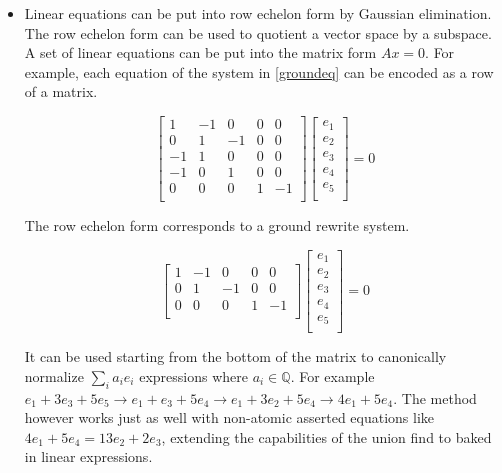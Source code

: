 \documentclass[sigconf]{acmart}
\begin{document}
\begin{itemize}

\item  Linear equations can be put into row echelon form by Gaussian elimination. The row echelon form can be used to quotient a vector space by a subspace. A set of linear equations can be put into the matrix form $Ax=0$. For example, each equation of the system in \ref{groundeq} can be encoded as a row of a matrix. 

\[
\begin{bmatrix}
1 & - 1 & 0 & 0 & 0 \\
0 & 1 & -1 & 0 & 0 \\
-1 & 1 & 0 & 0 & 0 \\
-1 & 0 & 1 & 0 & 0 \\
0 & 0 & 0 & 1 & -1 \\
\end{bmatrix}
\begin{bmatrix}
   e_1 \\
   e_2 \\
   e_3 \\
   e_4 \\
   e_5 \\
\end{bmatrix}
 = 0
\]

The row echelon form corresponds to a ground rewrite system. 

\[
\begin{bmatrix}
1 & - 1 & 0 & 0 & 0 \\
0 & 1 & -1 & 0 & 0 \\
0 & 0 & 0 & 1 & -1 \\
\end{bmatrix}
\begin{bmatrix}
   e_1 \\
   e_2 \\
   e_3 \\
   e_4 \\
   e_5 \\
\end{bmatrix}
 = 0
\]


It can be used starting from the bottom of the matrix to canonically normalize $\sum_i a_i e_i $ expressions where $a_i \in \mathbb{Q}$. For example $e_1 + 3e_3 + 5e_5 \rightarrow e_1 + e_3 + 5e_4 \rightarrow e_1 + 3e_2 + 5 e_4 \rightarrow 4e_1 + 5e_4$. The method however works just as well with non-atomic asserted equations like $4e_1 + 5e_4 = 13e_2 + 2e_3$, extending the capabilities of the union find to baked in linear expressions.




\end{itemize}
\end{document}
